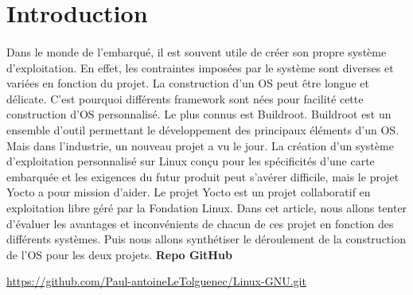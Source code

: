 \section{Introduction}
\paragraph{}
Dans le monde de l'embarqué, il est souvent utile de créer son propre système d'exploitation. En effet, les contraintes imposées par le système sont diverses et variées en fonction du projet.
La construction d'un OS peut être longue et délicate. C'est pourquoi différents framework sont nées pour facilité cette construction d'OS personnalisé. Le plus connus est Buildroot.
Buildroot est un ensemble d'outil permettant le développement des principaux éléments d'un OS. Mais dans l'industrie, un nouveau projet a vu le jour.
La création d'un système d'exploitation personnalisé sur Linux conçu pour les spécificités d'une carte embarquée et les exigences du futur produit peut s'avérer difficile, mais le projet Yocto a pour mission d'aider. 
Le projet Yocto est un projet collaboratif en exploitation libre géré par la Fondation Linux.
Dans cet article, nous allons tenter d'évaluer les avantages et inconvénients de chacun de ces projet en fonction des différents systèmes.
Puis nous allons synthétiser le déroulement de la construction de l'OS pour les deux projets.
\textbf{Repo GitHub}

\url{https://github.com/Paul-antoineLeTolguenec/Linux-GNU.git}

\newpage
